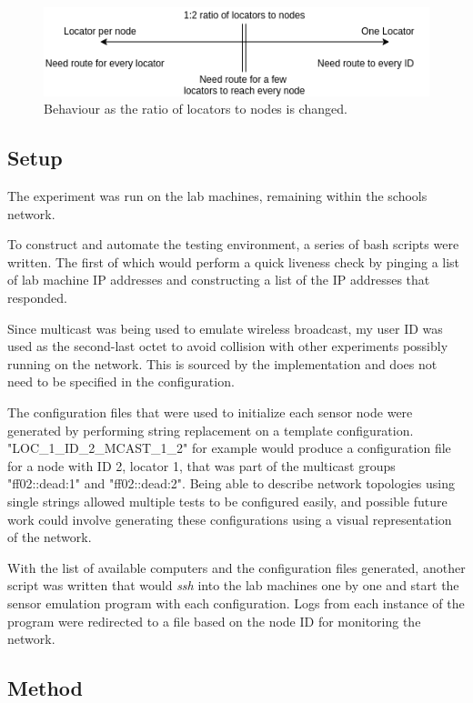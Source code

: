 \documentclass[12pt]{article}
\begin{document}
\begin{figure}[!ht]
	\centering
	\includegraphics[width=\linewidth]{images/spectrum}
	\caption{Behaviour as the ratio of locators to nodes is changed.}
	\label{fig:spectrum}
\end{figure}

\subsection{Setup}

The experiment was run on the lab machines, remaining within the schools network. 

To construct and automate the testing environment, a series of bash scripts were written. The first of which would perform a quick liveness check by pinging a list of lab machine IP addresses and constructing a list of the IP addresses that responded.

Since multicast was being used to emulate wireless broadcast, my user ID was used as the second-last octet to avoid collision with other experiments possibly running on the network. This is sourced by the implementation and does not need to be specified in the configuration.

The configuration files that were used to initialize each sensor node were generated by performing string replacement on a template configuration. "LOC\_1\_ID\_2\_MCAST\_1\_2" for example would produce a configuration file for a node with ID 2, locator 1, that was part of the multicast groups "ff02::dead:1" and "ff02::dead:2". Being able to describe network topologies using single strings allowed multiple tests to be configured easily, and possible future work could involve generating these configurations using a visual representation of the network.

With the list of available computers and the configuration files generated, another script was written that would \emph{ssh} into the lab machines one by one and start the sensor emulation program with each configuration. Logs from each instance of the program were redirected to a file based on the node ID for monitoring the network.

\subsection{Method}
\end{document}

